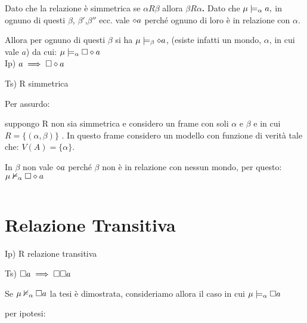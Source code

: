 Dato che la relazione è simmetrica se $\alpha R\beta$ allora \textbf{$\beta R\alpha$.}
Dato che $\mu\models_{\alpha}a,$ in ognuno di questi $\beta$, $\beta'$,$\beta''$
ecc. vale $\diamond a$ perché ognuno di loro è in relazione con $\alpha$.

Allora per ognuno di questi $\beta$ si ha $\mu\models_{\beta}\diamond a$,
(esiste infatti un mondo, $\alpha$, in cui vale $a$) da cui: $\mu\models_{\alpha}\square\diamond a$
\\


Ip) $a\implies\square\diamond a$

Ts) R simmetrica

Per assurdo:

suppongo R non sia simmetrica e considero un frame con soli $\alpha$
e $\beta$ e in cui $R=\{(\alpha,\beta)\}$ . In questo frame considero
un modello con funzione di verità tale che: $V(A)=\{\alpha\}$.

In $\beta$ non vale $\diamond a$ perché $\beta$ non è in relazione con
nessun mondo, per questo: $\mu\nvDash_{\alpha}\square\diamond a$

\begin{center}
\begin{center}   \end{center}
\par\end{center}

$ $


\section{Relazione Transitiva}

Ip) R relazione transitiva

Ts) $\square a\implies\square\square a$

Se $\mu\nvDash_{\alpha}\square a$ la tesi è dimostrata, consideriamo
allora il caso in cui $\mu\models_{\alpha}\square a$

per ipotesi:

